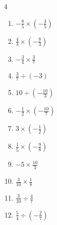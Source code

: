 \begin{multicols}{4}
\begin{enumerate}
  \item $\displaystyle -\frac{8}{5}\times{}\left(-\frac{3}{5}\right)$


  \item $\displaystyle \frac{4}{3}\times{}\left(-\frac{8}{3}\right)$


  \item $\displaystyle -\frac{3}{4}\times{}\frac{3}{7}$


  \item $\displaystyle \frac{3}{7}\div{}\left(-3\right)$


  \item $\displaystyle 10\div{}\left(-\frac{10}{3}\right)$

        \phantom{$\displaystyle =-3$}

  \item $\displaystyle -\frac{1}{2}\times{}\left(-\frac{10}{7}\right)$


  \item $\displaystyle 3\times{}\left(-\frac{1}{2}\right)$


\columnbreak %

  \item $\displaystyle \frac{1}{5}\times{}\left(-\frac{9}{8}\right)$


  \item $\displaystyle -5\times{}\frac{10}{3}$


  \item $\displaystyle \frac{3}{10}\times{}\frac{1}{8}$


  \item $\displaystyle \frac{3}{10}\div{}\frac{4}{7}$


  \item $\displaystyle \frac{5}{4}\div{}\left(-\frac{2}{7}\right)$


\end{enumerate}
\end{multicols}
